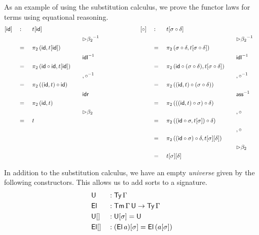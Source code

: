 \documentclass[acmsmall,review]{acmart}\settopmatter{printfolios=true,printccs=false,printacmref=false}
\begin{document}
As an example of using the substitution calculus, we prove the functor
laws for terms using equational reasoning.
\begin{alignat*}{15}
  & [\id] && : && t[\id] &&                      && && \hspace{6em} [\circ] && : && t[\sigma\circ\delta] \\
  & && && && && {\rhd\beta_2}^{-1}                && && && && && {\rhd\beta_2}^{-1} \\
  & && = \,\, && \pi_2\,(\id, t[\id]) &&         && && && = \,\, && \pi_2\,(\sigma\circ\delta, t[\sigma\circ\delta]) \\
  & && && && && {\idl}^{-1}                       && && && && && {\idl}^{-1} \\
  & && = \,\, && \pi_2\,(\id\circ\id, t[\id])    && && && && = \,\, && \pi_2\,(\id\circ(\sigma\circ\delta), t[\sigma\circ\delta]) \\
  & && && && && {,\circ}^{-1}                    && && && && && {,\circ}^{-1} \\
  & && = \,\, && \pi_2\,((\id, t)\circ\id) &&    && && && = \,\, && \pi_2\,((\id, t)\circ(\sigma\circ\delta)) \\
  & && && && && \idr                             && && && && && \ass^{-1} \\
  & && = \,\, && \pi_2\,(\id, t) &&              && && && = \,\, && \pi_2\,(((\id, t)\circ\sigma)\circ\delta) \\
  & && && && && {\rhd\beta_2}                    && && && && && {,\circ} \\
  & && = \,\, && t &&                            && && && = \,\, && \pi_2\,((\id\circ\sigma, t[\sigma])\circ\delta) \\
  & && && &&                                     && && && && && && {,\circ} \\
  & && && &&                                     && && && = \,\, && \pi_2\,((\id\circ\sigma)\circ\delta, t[\sigma][\delta]) \\
  & && && &&                                     && && && && && && {\rhd\beta_2} \\
  & && && &&                                     && && && = \,\, && t[\sigma][\delta]
\end{alignat*}

In addition to the substitution calculus, we have an empty {\em
  universe} given by the following constructors. This allows us to add
sorts to a signature.
\begin{alignat*}{5}
  & \mathsf{U} && : \mathsf{Ty}\,\Gamma \\
  & \mathsf{El} && : \mathsf{Tm}\,\Gamma\,\mathsf{U} \rightarrow \mathsf{Ty}\,\Gamma \\
  & {\mathsf{U}[]} && : \mathsf{U}[\sigma] = \mathsf{U} \\
  & {\mathsf{El}[]} && : (\mathsf{El}\,a)[\sigma] = \mathsf{El}\,(a[\sigma])
\end{alignat*}
\end{document}
